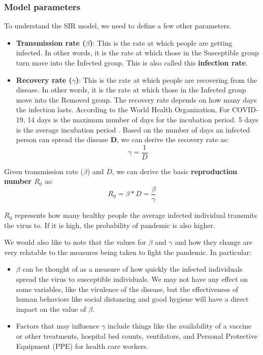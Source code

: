 \documentclass[11pt]{article}
\begin{document}
\subsubsection{Model parameters}
To understand the SIR model, we need to define a few other parameters.
\begin{itemize}
    \item \textbf{Transmission rate ($\beta $)}: This is the rate at which people are getting infected. In other words, it is the rate at which those in the Susceptible group turn move into the Infected group. This is also called this \textbf{infection rate}.
    \item \textbf{Recovery rate ($\gamma $)}: This is the rate at which people are recovering from the disease. In other words, it is the rate at which those in the Infected group move into the Removed group. The recovery rate depends on how many days the infection lasts. According to the World Health Organization, For COVID-19, 14 days is the maximum number of days for the incubation period. 5 days is the average incubation period \cite{who-website}. Based on the number of days an infected person can spread the disease $\textbf{D}$, we can derive the recovery rate as:
    \begin{equation}
        \label{eq1}
        \gamma = \frac{1}{D}
    \end{equation}
\end{itemize}

Given transmission rate ($\beta$) and $D$, we can derive the basic \textbf{reproduction number $R_{0}$} as:
\begin{equation}
    \label{eq6}
    R_{0} = \beta * D = \frac{\beta}{\gamma}
\end{equation}

$R_{0}$ represents how many healthy people the average infected individual transmits the virus to. If it is high, the probability of pandemic is also higher.

We would also like to note that the values for $\beta$ and $\gamma$ and how they change are very relatable to the measures being taken to fight the pandemic. In particular:
\begin{itemize}
    \item $\beta$ can be thought of as a measure of how quickly the infected individuals spread the virus to susceptible individuals. We may not have any effect on some variables, like the virulence of the disease, but the effectiveness of human behaviors like social distancing and good hygiene will have a direct impact on the value of $\beta$.
    \item Factors that may influence $\gamma$ include things like the availability of a vaccine or other treatments, hospital bed counts, ventilators, and Personal Protective Equipment (PPE) for health care workers.
\end{itemize}
\end{document}
